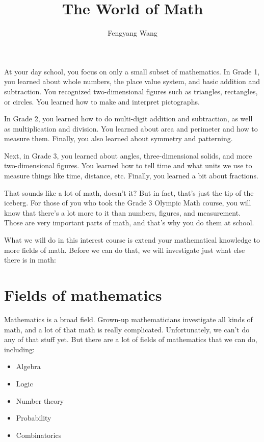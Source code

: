 \documentclass[letterpaper,10pt]{article}
\title{The World of Math}
\author{Fengyang Wang}
\begin{document}
\maketitle

At your day school, you focus on only a small subset of mathematics.
In Grade 1, you learned about whole numbers, the place value system,
and basic addition and subtraction. You recognized two-dimensional
figures such as triangles, rectangles, or circles. You learned how to
make and interpret pictographs.

In Grade 2, you learned how to do multi-digit addition and subtraction,
as well as multiplication and division. You learned about area and
perimeter and how to measure them. Finally, you also learned about
symmetry and patterning.

Next, in Grade 3, you learned about angles, three-dimensional solids,
and more two-dimensional figures. You learned how to tell time and what
units we use to measure things like time, distance, etc. Finally, you
learned a bit about fractions.

That sounds like a lot of math, doesn't it? But in fact, that's just
the tip of the iceberg. For those of you who took the Grade 3
Olympic Math course, you will know that there's a lot more to it than
numbers, figures, and measurement. Those are very important parts of
math, and that's why you do them at school.

What we will do in this interest course is extend your mathematical knowledge
to more fields of math. Before we can do that, we will investigate
just what else there is in math:

\section{Fields of mathematics}

Mathematics is a broad field. Grown-up mathematicians investigate all kinds
of math, and a lot of that math is really complicated. Unfortunately, we
can't do any of that stuff yet. But there are a lot of fields of mathematics
that we can do, including:

\begin{itemize}
 \item Algebra
 \item Logic
 \item Number theory
 \item Probability
 \item Combinatorics
\end{itemize}
\end{document}
